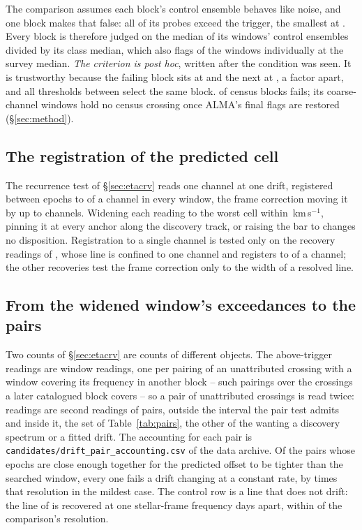 The comparison assumes each block's control ensemble behaves like noise, and
one block makes that false: all \NCtrl{} of its probes exceed the trigger, the
smallest at \BqFailCtrlMin. Every block is therefore judged on the median of
its windows' control ensembles divided by its class median, which also flags
\DqNWin{} of the \NWindows{} windows individually at \BqFactor{} the survey
median. \emph{The criterion is post hoc}, written after the condition was
seen. It is trustworthy because the failing block sits at \BqFailQ{} and the
next at \BqNextQ, a factor \QsRatio{} apart, and all \QsNStep{} thresholds
between select the same block. \BqNFail{} of \BqNBlocks{} census blocks fails;
its \BqFailNWin{} coarse-channel windows hold no census crossing once ALMA's
final flags are restored (\S\ref{sec:method}).

\subsection{The registration of the predicted cell}
\label{sec:regbudget}

The recurrence test of \S\ref{sec:etacrv} reads one channel at one drift,
registered between epochs to \RgBudgetChMed{} of a channel in every window,
the frame correction moving it by up to \ZtFrameChanMax{} channels. Widening
each reading to the worst cell within \RgTolKms\,km\,s$^{-1}$, pinning it at
every anchor along the discovery track, or raising the bar to \ZtTrialThr{}
changes no disposition. Registration to a single channel is tested only on
the \RgRegNUnres{} recovery readings of \RgRegStar, whose line is confined to
one channel and registers to \RgRegMaxCh{} of a channel; the other recoveries
test the frame correction only to the width of a resolved line.

\subsection{From the widened window's exceedances to the pairs}
\label{sec:pairacct}

Two counts of \S\ref{sec:etacrv} are counts of different objects. The
\WdNExc{} above-trigger readings are window readings, one per pairing of an
unattributed crossing with a window covering its frequency in another block
-- \WdNCov{} such pairings over the \PaNCovWinCross{} crossings a later
catalogued block covers -- so a pair of unattributed crossings is read twice:
\PaNPairTwice{} readings are second readings of \PaNPairRead{} pairs,
\PaNPairBeyond{} outside the interval the pair test admits and
\PaNPairInside{} inside it, the set of Table~\ref{tab:pairs}, the other
\TjNCandLost{} of the \TjNCandPair{} wanting a discovery spectrum or a fitted
drift. The accounting for each pair is
\texttt{candidates/\allowbreak drift\_pair\_accounting.csv} of the data
archive. Of the \TjNPower{} pairs whose epochs are close enough together for
the predicted offset to be tighter than the searched window, every one fails
a drift changing at a constant rate, by \TjSigMin{} times that resolution in
the mildest case. The control row is a line that does not drift: the
\TjCtlLine{} line of \TjCtlStar{} is recovered at one stellar-frame frequency
\TjCtlDtD{} days apart, within \TjCtlNSig{} of the comparison's resolution.

